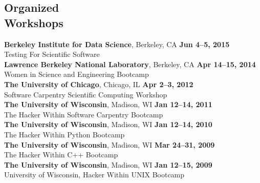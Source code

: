 \documentclass[margin,line]{resume}
\begin{document}
\begin{resume}
    \section{\mysidestyle Organized\\Workshops}
    \textbf{Berkeley Institute for Data Science}, Berkeley, CA \hfill \textbf{Jun 4--5, 2015}\\
    Testing For Scientific Software
               \vspace{2mm}\\
    \textbf{Lawrence Berkeley National Laboratory}, Berkeley, CA \hfill \textbf{Apr 14--15, 2014}\\
    Women in Science and Engineering Bootcamp
               \vspace{2mm}\\
    \textbf{The University of Chicago}, Chicago, IL \hfill \textbf{Apr 2--3, 2012}\\
    Software Carpentry Scientific Computing Workshop
               \vspace{2mm}\\
    \textbf{The University of Wisconsin}, Madison, WI \hfill\textbf{Jan 12--14, 2011}\\
    The Hacker Within Software Carpentry Bootcamp
               \vspace{2mm}\\
    \textbf{The University of Wisconsin}, Madison, WI \hfill \textbf{Jan 12--14, 2010}\\
    The Hacker Within Python Bootcamp
               \vspace{2mm}\\
    \textbf{The University of Wisconsin}, Madison, WI \hfill \textbf{Mar 24--31, 2009}\\
    The Hacker Within C++ Bootcamp
               \vspace{2mm}\\
    \textbf{The University of Wisconsin}, Madison, WI \hfill \textbf{Jan 12--15, 2009}\\
    University of Wisconsin, Hacker Within UNIX Bootcamp\\


\end{resume}
\end{document}
